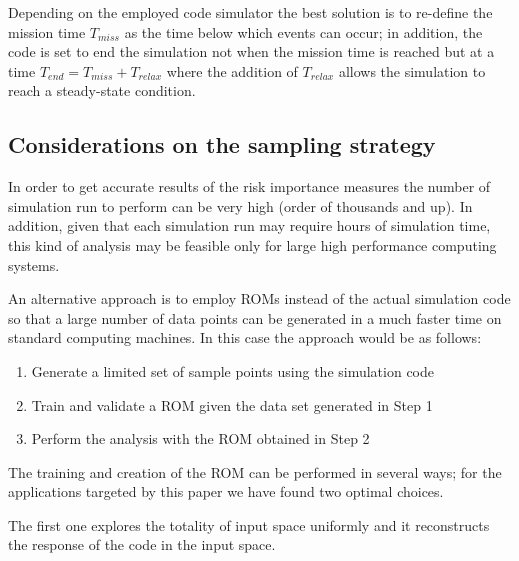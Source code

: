 Depending on the employed code simulator the best solution is to re-define the mission time $T_{miss}$ as the 
time below which events can occur; in addition, the code is set to end the simulation not when the mission 
time is reached but at a time $T_{end} = T_{miss} + T_{relax}$ where the addition of $T_{relax}$ allows 
the simulation to reach a steady-state condition.

\subsection{Considerations on the sampling strategy}
\label{sec:samplingStrategy}

In order to get accurate results of the risk importance measures the number of simulation run to perform 
can be very high (order of thousands and up). In addition, given that each simulation run may require 
hours of simulation time, this kind of analysis may be feasible only for large high performance computing 
systems.

An alternative approach is to employ ROMs instead of the actual simulation code so that a large number of 
data points can be generated in a much faster time on standard computing machines.
In this case the approach would be as follows:
\begin{enumerate}
  \item Generate a limited set of sample points using the simulation code 
  \item Train and validate a ROM given the data set generated in Step 1
  \item Perform the analysis with the ROM obtained in Step 2
\end{enumerate}
The training and creation of the ROM can be performed in several ways; for the applications targeted by this 
paper we have found two optimal choices.

The first one explores the totality of input space uniformly and it reconstructs the response of the code in 
the input space. 

